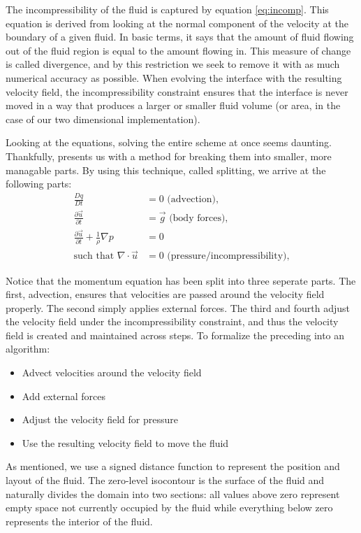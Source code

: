 The incompressibility of the fluid is captured by equation
\vref{eq:incomp}. This equation is derived from looking at the normal
component of the velocity at the boundary of a given fluid. In
basic terms, it says that the amount of fluid flowing out of the fluid
region is equal to the amount flowing in. This measure of change is
called divergence, and by this restriction we seek to remove it with
as much numerical accuracy as possible. When evolving the interface
with the resulting velocity field, the incompressibility constraint
ensures that the interface is never moved in a way that produces a
larger or smaller fluid volume (or area, in the case of our two
dimensional implementation).

Looking at the equations, solving the entire scheme at once seems
daunting. Thankfully,  presents us with a method
for breaking them into smaller, more managable parts. By using this
technique, called splitting, we arrive at the following parts:
\begin{align}
  \label{eq:advection}
  \frac{Dq}{Dt}&=0 \text{    (advection),}\\
  \label{eq:forces}
  \frac{\partial \vec{u}}{\partial t} &= \vec{g} \text{    (body forces),}\\
  \label{eq:pressure}
  \frac{\partial \vec{u}}{\partial t} + \frac{1}{\rho}\nabla p &= 0\\
  \label{eq:divergence}
  \text{such that } \nabla\cdot\vec{u}&=0 \text{    (pressure/incompressibility),}
\end{align}

Notice that the momentum equation has been split into three seperate
parts. The first, advection, ensures that velocities are passed around
the velocity field properly. The second simply applies external
forces. The third and fourth adjust the velocity field under the
incompressibility constraint, and thus the velocity field is created
and maintained across steps. To formalize the preceding into an
algorithm:
\begin{itemize}
\item Advect velocities around the velocity field
\item Add external forces
\item Adjust the velocity field for pressure
\item Use the resulting velocity field to move the fluid
\end{itemize}
As mentioned, we use a signed distance function to represent the
position and layout of the fluid. The zero-level isocontour is the
surface of the fluid and naturally divides the domain into two
sections: all values above zero represent empty space not currently
occupied by the fluid while everything below zero represents the
interior of the fluid.

